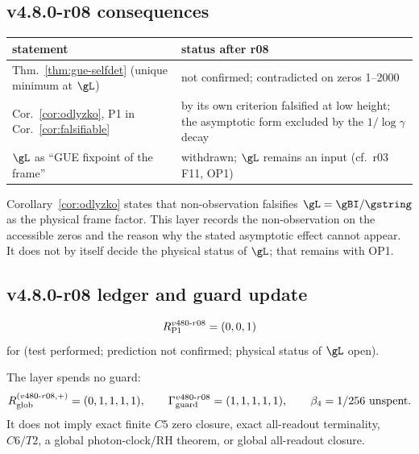 \subsection*{v4.8.0-r08 consequences}
\label{subsec:v480-r08-consequences}

\begin{center}
\small
\begin{tabular}{@{}>{\raggedright\arraybackslash}p{}>{\raggedright\arraybackslash}p{}@{}}
\toprule
statement & status after r08\\
\midrule
Thm.~\ref{thm:gue-selfdet} (unique minimum at \(\gL\)) & not confirmed; contradicted on zeros 1--2000\\
Cor.~\ref{cor:odlyzko}, P1 in Cor.~\ref{cor:falsifiable} & by its own criterion falsified at low height; the asymptotic form excluded by the \(1/\log\gamma\) decay\\
\(\gL\) as ``GUE fixpoint of the frame'' & withdrawn; \(\gL\) remains an input (cf.\ r03 F11, OP1)\\
\bottomrule
\end{tabular}
\end{center}

Corollary~\ref{cor:odlyzko} states that non-observation falsifies \(\gL=\gBI/\gstring\) as the
physical frame factor.  This layer records the non-observation on the accessible zeros and the
reason why the stated asymptotic effect cannot appear.  It does not by itself decide the physical
status of \(\gL\); that remains with OP1.

\subsection*{v4.8.0-r08 ledger and guard update}
\label{subsec:v480-r08-ledger-guard}

\[
R_{\rm P1}^{v480\text{-}r08}=(0,0,1)
\]
for (test performed; prediction not confirmed; physical status of \(\gL\) open).

The layer spends no guard:
\[
R_{\rm glob}^{(v480\text{-}r08,+)}=(0,1,1,1,1),
\qquad
\Gamma_{\rm guard}^{v480\text{-}r08}=(1,1,1,1,1),
\qquad
\beta_4=1/256\ \text{unspent}.
\]
It does not imply exact finite \(C5\) zero closure, exact all-readout terminality,
\(C6/T2\), a global photon-clock/RH theorem, or global all-readout closure.

